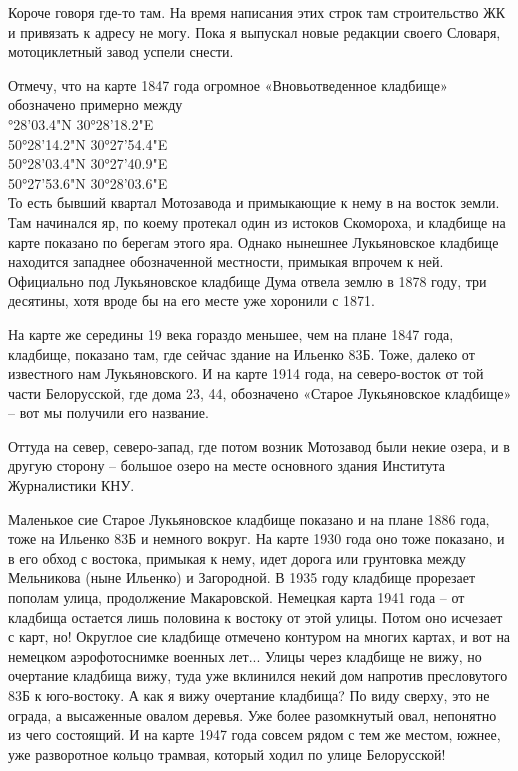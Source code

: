 Короче говоря где-то там. На время написания этих строк там строительство ЖК и привязать к адресу не могу. Пока я выпускал новые редакции своего Словаря, мотоциклетный завод успели снести.

Отмечу, что на карте 1847 года огромное «Вновьотведенное кладбище» обозначено примерно между\\ 

°28'03.4"N 30°28'18.2"E\\
50°28'14.2"N 30°27'54.4"E\\
50°28'03.4"N 30°27'40.9"E\\
50°27'53.6"N 30°28'03.6"E\\

То есть бывший квартал Мотозавода и примыкающие к нему в на восток земли. Там начинался яр, по коему протекал один из истоков Скомороха, и кладбище на карте показано по берегам этого яра. Однако нынешнее Лукьяновское кладбище находится западнее обозначенной местности, примыкая впрочем к ней. Официально под Лукьяновское кладбище Дума отвела землю в 1878 году, три десятины, хотя вроде бы на его месте уже хоронили с 1871.

На карте же середины 19 века гораздо меньшее, чем на плане 1847 года, кладбище, показано там, где сейчас здание на Ильенко 83Б. Тоже, далеко от известного нам Лукьяновского. И на карте 1914 года, на северо-восток от той части Белорусской, где дома 23, 44, обозначено «Старое Лукьяновское кладбище» – вот мы получили его название.

Оттуда на север, северо-запад, где потом возник Мотозавод были некие озера, и в другую сторону – большое озеро на месте основного здания Института Журналистики КНУ.

Маленькое сие Старое Лукьяновское кладбище показано и на плане 1886 года, тоже на Ильенко 83Б и немного вокруг. На карте 1930 года оно тоже показано, и в его обход с востока, примыкая к нему, идет дорога или грунтовка между Мельникова (ныне Ильенко) и Загородной. В 1935 году кладбище прорезает пополам улица, продолжение Макаровской. Немецкая карта 1941 года – от кладбища остается лишь половина к востоку от этой улицы. Потом оно исчезает с карт, но! Округлое сие кладбище отмечено контуром на многих картах, и вот на немецком аэрофотоснимке военных лет... Улицы через кладбище не вижу, но очертание кладбища вижу, туда уже вклинился некий дом напротив пресловутого 83Б к юго-востоку. А как я вижу очертание кладбища? По виду сверху, это не ограда, а высаженные овалом деревья. Уже более разомкнутый овал, непонятно из чего состоящий. И на карте 1947 года совсем рядом с тем же местом, южнее, уже разворотное кольцо трамвая, который ходил по улице Белорусской!

